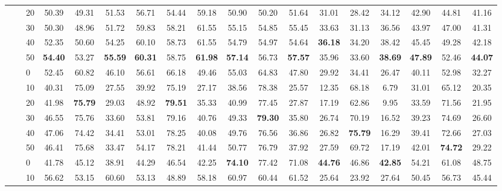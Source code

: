 \begin{table*}[!h]
{\begin{tabular}{lllccc|ccc|ccc|ccc|ccc}
 \textbf{} & \textbf{} & 20 & 50.39 & 49.31 & 51.53 & 56.71 & 54.44 & 59.18 & 50.90 & 50.20 & 51.64 & 31.01 & 28.42 & 34.12 & 42.90 & 44.81 & 41.16 \\ 
 \textbf{} & \textbf{} & 30 & 50.30 & 48.96 & 51.72 & 59.83 & 58.21 & 61.55 & 55.15 & 54.85 & 55.45 & 33.63 & 31.13 & 36.56 & 43.97 & 47.00 & 41.31 \\ 
 \textbf{} & \textbf{} & 40 & 52.35 & 50.60 & 54.25 & 60.10 & 58.73 & 61.55 & 54.79 & 54.97 & 54.64 & \textbf{36.18} & 34.20 & 38.42 & 45.45 & 49.28 & 42.18 \\ 
 \textbf{} & \textbf{} & 50 & \textbf{54.40} & 53.27 & \textbf{55.59} & \textbf{60.31} & 58.75 & \textbf{61.98} & \textbf{57.14} & 56.73 & \textbf{57.57} & 35.96 & 33.60 & \textbf{38.69} & \textbf{47.89} & 52.46 & \textbf{44.07} \\ 
 \arrayrulecolor{gray}\cline{2-18}\arrayrulecolor{black}
\textbf{} & \textbf{\multirow{6}{*}{SC}} & 0 & 52.45 & 60.82 & 46.10 & 56.61 & 66.18 & 49.46 & 55.03 & 64.83 & 47.80 & 29.92 & 34.41 & 26.47 & 40.11 & 52.98 & 32.27 \\ 
 \textbf{} & \textbf{} & 10 & 40.31 & 75.09 & 27.55 & 39.92 & 75.19 & 27.17 & 38.56 & 78.38 & 25.57 & 12.35 & 68.18 & 6.79 & 31.01 & 65.12 & 20.35 \\ 
 \textbf{} & \textbf{} & 20 & 41.98 & \textbf{75.79} & 29.03 & 48.92 & \textbf{79.51} & 35.33 & 40.99 & 77.45 & 27.87 & 17.19 & 62.86 & 9.95 & 33.59 & 71.56 & 21.95 \\ 
 \textbf{} & \textbf{} & 30 & 46.55 & 75.76 & 33.60 & 53.81 & 79.16 & 40.76 & 49.33 & \textbf{79.30} & 35.80 & 26.74 & 70.19 & 16.52 & 39.23 & 74.69 & 26.60 \\ 
 \textbf{} & \textbf{} & 40 & 47.06 & 74.42 & 34.41 & 53.01 & 78.25 & 40.08 & 49.76 & 76.56 & 36.86 & 26.82 & \textbf{75.79} & 16.29 & 39.41 & 72.66 & 27.03 \\ 
 \textbf{} & \textbf{} & 50 & 46.41 & 75.68 & 33.47 & 54.17 & 78.21 & 41.44 & 50.77 & 76.79 & 37.92 & 27.59 & 69.72 & 17.19 & 42.01 & \textbf{74.72} & 29.22 \\ 
\hline
\arrayrulecolor{gray}\cline{2-18}\arrayrulecolor{black}
\textbf{\multirow{12}{*}{Aspect Category}} & \textbf{\multirow{6}{*}{-}} & 0 & 41.78 & 45.12 & 38.91 & 44.29 & 46.54 & 42.25 & \textbf{74.10} & 77.42 & 71.08 & \textbf{44.76} & 46.86 & \textbf{42.85} & 54.21 & 61.08 & 48.75 \\ 
 \textbf{} & \textbf{} & 10 & 56.62 & 53.15 & 60.60 & 53.13 & 48.89 & 58.18 & 60.97 & 60.44 & 61.52 & 25.64 & 23.92 & 27.64 & 50.45 & 56.73 & 45.44 \\ 

\end{tabular}}
\end{table*}
